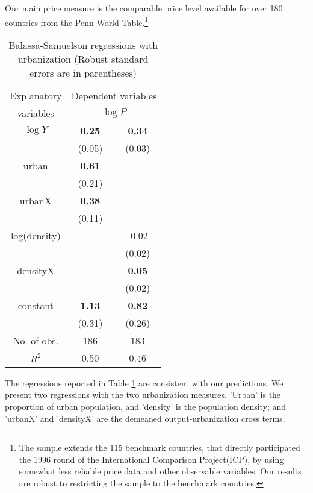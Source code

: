 \documentclass[12pt]{article}
\begin{document}
Our main price measure is the comparable price level available for
over 180 countries from the Penn World Table.\footnote{The sample
extends the 115 benchmark countries, that directly participated the
1996 round of the International Comparison Project(ICP), by using
somewhat less reliable price data and other observable variables.
Our results are robust to restricting the sample to the benchmark
countries.} 

\begin{table}[h!]
\caption{Balassa-Samuelson regressions with urbanization (Robust
standard errors are in parentheses)} \center \label{tab:BS}
\begin{tabular}{c|cc}
  \hline\hline
  Explanatory & \multicolumn{2}{c}{Dependent variables} \\
  variables &\multicolumn{2}{c}{$\log P$} \\ \hline
  $\log Y$ & \textbf{0.25} & \textbf{0.34} \\
           & (0.05)        & (0.03)        \\
  urban    & \textbf{0.61} &               \\
           & (0.21)        &               \\
  urbanX   & \textbf{0.38} &               \\
           & (0.11)        &               \\
  log(density) &           & -0.02         \\
             &             & (0.02)        \\
  densityX &               & \textbf{0.05} \\
           &               & (0.02)        \\
  constant & \textbf{1.13} & \textbf{0.82} \\
           & (0.31)        & (0.26)        \\ \hline
  No. of obs. & 186        & 183           \\
  $R^2$    & 0.50          & 0.46          \\
  \hline\hline
\end{tabular}
\end{table}

The regressions reported in Table \ref{tab:BS} are consistent with our predictions. We present two regressions with the two urbanization measures. 'Urban' is the proportion of urban population, and 'density' is the population density; and 'urbanX' and 'densityX' are the demeaned
output-urbanization cross terms.
\end{document}
